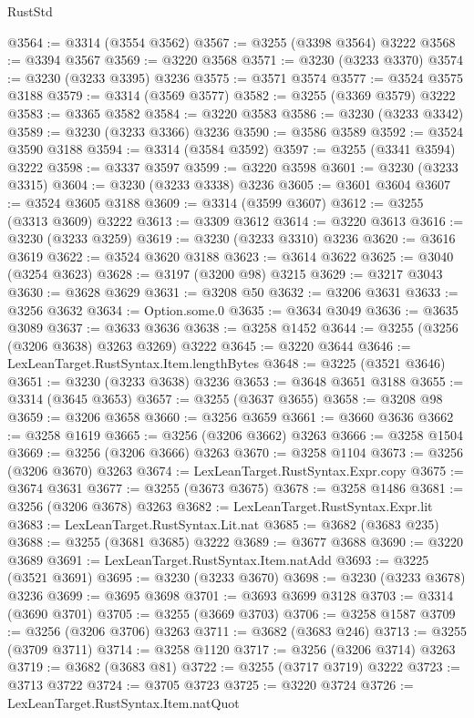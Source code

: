 \begin{lexlean}{RustStd}
\begin{coremodule}
{\begin{coremodule}
{{{{{{{{{{{{{{{{{{{{{{{{{{{{{{{{{{{{{@3564 := @3314 (@3554 @3562)
@3567 := @3255 (@3398 @3564) @3222
@3568 := @3394 @3567
@3569 := @3220 @3568
@3571 := @3230 (@3233 @3370)
@3574 := @3230 (@3233 @3395) @3236
@3575 := @3571 @3574
@3577 := @3524 @3575 @3188
@3579 := @3314 (@3569 @3577)
@3582 := @3255 (@3369 @3579) @3222
@3583 := @3365 @3582
@3584 := @3220 @3583
@3586 := @3230 (@3233 @3342)
@3589 := @3230 (@3233 @3366) @3236
@3590 := @3586 @3589
@3592 := @3524 @3590 @3188
@3594 := @3314 (@3584 @3592)
@3597 := @3255 (@3341 @3594) @3222
@3598 := @3337 @3597
@3599 := @3220 @3598
@3601 := @3230 (@3233 @3315)
@3604 := @3230 (@3233 @3338) @3236
@3605 := @3601 @3604
@3607 := @3524 @3605 @3188
@3609 := @3314 (@3599 @3607)
@3612 := @3255 (@3313 @3609) @3222
@3613 := @3309 @3612
@3614 := @3220 @3613
@3616 := @3230 (@3233 @3259)
@3619 := @3230 (@3233 @3310) @3236
@3620 := @3616 @3619
@3622 := @3524 @3620 @3188
@3623 := @3614 @3622
@3625 := @3040 (@3254 @3623)
@3628 := @3197 (@3200 @98) @3215
@3629 := @3217 @3043
@3630 := @3628 @3629
@3631 := @3208 @50
@3632 := @3206 @3631
@3633 := @3256 @3632
@3634 := Option.some.{0}
@3635 := @3634 @3049
@3636 := @3635 @3089
@3637 := @3633 @3636
@3638 := @3258 @1452
@3644 := @3255 (@3256 (@3206 @3638) @3263 @3269) @3222
@3645 := @3220 @3644
@3646 := LexLeanTarget.RustSyntax.Item.lengthBytes
@3648 := @3225 (@3521 @3646)
@3651 := @3230 (@3233 @3638) @3236
@3653 := @3648 @3651 @3188
@3655 := @3314 (@3645 @3653)
@3657 := @3255 (@3637 @3655)
@3658 := @3208 @98
@3659 := @3206 @3658
@3660 := @3256 @3659
@3661 := @3660 @3636
@3662 := @3258 @1619
@3665 := @3256 (@3206 @3662) @3263
@3666 := @3258 @1504
@3669 := @3256 (@3206 @3666) @3263
@3670 := @3258 @1104
@3673 := @3256 (@3206 @3670) @3263
@3674 := LexLeanTarget.RustSyntax.Expr.copy
@3675 := @3674 @3631
@3677 := @3255 (@3673 @3675)
@3678 := @3258 @1486
@3681 := @3256 (@3206 @3678) @3263
@3682 := LexLeanTarget.RustSyntax.Expr.lit
@3683 := LexLeanTarget.RustSyntax.Lit.nat
@3685 := @3682 (@3683 @235)
@3688 := @3255 (@3681 @3685) @3222
@3689 := @3677 @3688
@3690 := @3220 @3689
@3691 := LexLeanTarget.RustSyntax.Item.natAdd
@3693 := @3225 (@3521 @3691)
@3695 := @3230 (@3233 @3670)
@3698 := @3230 (@3233 @3678) @3236
@3699 := @3695 @3698
@3701 := @3693 @3699 @3128
@3703 := @3314 (@3690 @3701)
@3705 := @3255 (@3669 @3703)
@3706 := @3258 @1587
@3709 := @3256 (@3206 @3706) @3263
@3711 := @3682 (@3683 @246)
@3713 := @3255 (@3709 @3711)
@3714 := @3258 @1120
@3717 := @3256 (@3206 @3714) @3263
@3719 := @3682 (@3683 @81)
@3722 := @3255 (@3717 @3719) @3222
@3723 := @3713 @3722
@3724 := @3705 @3723
@3725 := @3220 @3724
@3726 := LexLeanTarget.RustSyntax.Item.natQuot
}}}}}}}}}}}}}}}}}}}}}}}}}}}}}}}}}}}}}
\end{coremodule}}
\end{coremodule}
\end{lexlean}
